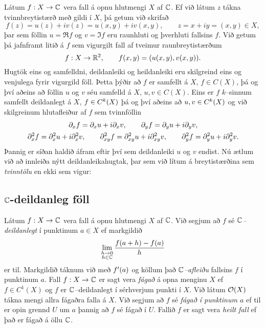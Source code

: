 \noindent
Látum $f:X\to {\mathbb C}$ vera fall á opnu hlutmengi $X$ af ${\mathbb C}$.  
Ef við látum $z$ tákna tvinnbreytistærð með gildi í $X$, þá getum við
skrifað 
 \begin{equation*}f(z)=u(z)+iv(z)=u(x,y)+iv(x,y), \qquad z=x+iy=(x,y) \in X,
\label{4.2.1}
 \end{equation*}
þar sem föllin $u=\Re f$ og $v=\Im f$ eru raunhluti og þverhluti
fallsins $f$.
Við getum þá jafnframt litið á $f$ sem vigurgilt fall
af tveimur raunbreytistærðum
 \begin{equation*}f:X\to {\mathbb R}\sp 2, \qquad f(x,y)=(u(x,y), v(x,y)).
\label{4.2.2}
 \end{equation*}
Hugtök eins og samfelldni, deildanleiki og heildanleiki  eru
skilgreind eins og venjulega fyrir vigurgild föll.  Þetta þýðir að
$f$ er samfellt á $X$, $f\in C(X)$, þá og því aðeins að föllin $u$ og
$v$ séu samfelld á $X$, $u,v\in C(X)$.  Eins er $f$ $k$--sinnum
samfellt deildanlegt á $X$, $f\in C\sp k(X)$ þá og því aðeins að
$u,v\in C\sp k(X)$  og við skilgreinum hlutafleiður af $f$ sem tvinnföllin
\begin{gather*}
\partial_xf=\partial_xu+i\partial_xv, \qquad
\partial_yf=\partial_yu+i\partial_yv,\\
\partial\sp 2_xf=\partial\sp 2_xu+i\partial\sp 2_xv, \qquad
\partial\sp 2_{xy}f=\partial\sp 2_{xy}u+i\partial\sp 2_{xy}v,\qquad
\partial\sp 2_yf=\partial\sp 2_yu+i\partial\sp 2_yv.
\end{gather*}
Þannig er síðan haldið áfram eftir því sem deildanleiki $u$ og $v$
endist.  Nú ætlum við að innleiða nýtt deildanleikahugtak, þar sem
við lítum á breytistærðina sem {\it tvinntölu} en ekki sem vigur:

\subsection*{${\mathbb C}$-deildanleg föll}

\begin{sk}
Látum $f:X\to {\mathbb C}$ vera fall á opnu hlutmengi $X$ af ${\mathbb C}$.  
Við segjum
að $f$ sé {\it ${\mathbb C}$--deildanlegt} í punktinum $a\in X$ ef markgildið
 \begin{equation*}\lim _{\substack{ h\to 0\\ h\in{\mathbb C}}}
 \dfrac{f(a+h)-f(a)}h  \label{4.2.3}
 \end{equation*}
er til.  Markgildið táknum við með $f{\sp{\prime}}(a)$ og köllum það
{\it ${\mathbb C}$--afleiðu} fallsins $f$ í punktinum $a$.  
Fall $f:X\to {\mathbb C}$ er sagt vera {\it fágað} á opna menginu $X$ ef $f\in
C^1(X)$ og $f$ er ${\mathbb C}$--deildanlegt í sérhverjum punkti í $X$.  Við
látum ${\cal O}(X)$ tákna mengi allra fágaðra falla á $X$.  Við segjum að
$f$ sé {\it fágað í punktinum $a$} ef til er opin grennd $U$ um $a$ þannig
að $f$ sé fágað í $U$.  Fallið $f$ er sagt vera {\it heilt fall} ef
það er fágað á  öllu ${\mathbb C}$.
\end{sk}


